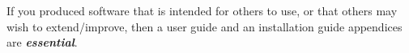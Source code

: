 If you produced software that is intended for others to use, or that others may 
wish to extend/improve, then a user guide and an installation guide appendices 
are \textbf{\textit{essential}}.
